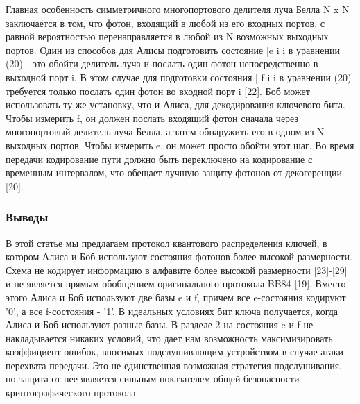 Главная особенность симметричного многопортового делителя луча Белла N x N заключается в том, что фотон, входящий в любой из его входных портов, с равной вероятностью перенаправляется в любой из N возможных выходных портов. Один из способов для Алисы подготовить состояние |e i i в уравнении (20) - это обойти делитель луча и послать один фотон непосредственно в выходной порт i. В этом случае для подготовки состояния | f i i в уравнении (20) требуется только послать один фотон во входной порт i [22]. Боб может использовать ту же установку, что и Алиса, для декодирования ключевого бита. Чтобы измерить f, он должен послать входящий фотон сначала через многопортовый делитель луча Белла, а затем обнаружить его в одном из N выходных портов. Чтобы измерить e, он может просто обойти этот шаг. Во время передачи кодирование пути должно быть переключено на кодирование с временным интервалом, что обещает лучшую защиту фотонов от декогеренции [20].

\subsubsection{Выводы}

В этой статье мы предлагаем протокол квантового распределения ключей, в котором Алиса и Боб используют состояния фотонов более высокой размерности. Схема не кодирует информацию в алфавите более высокой размерности [23]-[29] и не является прямым обобщением оригинального протокола BB84 [19]. Вместо этого Алиса и Боб используют две базы e и f, причем все e-состояния кодируют '0', а все f-состояния - '1'. В идеальных условиях бит ключа получается, когда Алиса и Боб используют разные базы. В разделе 2 на состояния e и f не накладывается никаких условий, что дает нам возможность максимизировать коэффициент ошибок, вносимых подслушивающим устройством в случае атаки перехвата-передачи. Это не единственная возможная стратегия подслушивания, но защита от нее является сильным показателем общей безопасности криптографического протокола.

